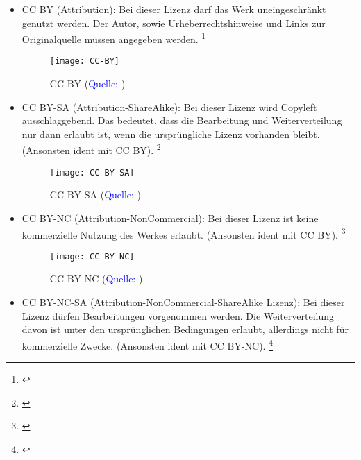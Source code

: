 \documentclass[titlepage,12pt,twoside]{article}
\begin{document}
\begin{itemize}
	\item CC BY (Attribution): Bei dieser  Lizenz darf das Werk uneingeschränkt genutzt werden. Der Autor, sowie 
	Urheberrechtshinweise und Links zur Originalquelle müssen angegeben werden. \footnote{\cite{bpb}}
	\begin{figure}[H]
		\begin{center}
			\scalebox{0.4}
			{\texttt{[image: CC-BY]}}
			\caption{CC BY (\textcolor{blue}{Quelle: \cite{CreativeCommonsBilder}})}
			\label{fig:CC BY}
		\end{center}
	\end{figure}
	\hfill \break
	\item CC BY-SA (Attribution-ShareAlike): Bei dieser  Lizenz wird Copyleft 
	ausschlaggebend. Das bedeutet, dass die Bearbeitung und Weiterverteilung nur dann erlaubt ist, wenn die ursprüngliche Lizenz vorhanden 
	bleibt. (Ansonsten ident mit CC BY). \footnote{\cite{bpb}}
	\begin{figure}[H]
		\begin{center}
			\scalebox{0.4}
			{\texttt{[image: CC-BY-SA]}}
			\caption{CC BY-SA (\textcolor{blue}{Quelle: \cite{CreativeCommonsBilder}})}
			\label{fig:CC BY-SA}
		\end{center}
	\end{figure}
	\hfill \break
	\item CC BY-NC (Attribution-NonCommercial): Bei dieser  Lizenz ist keine kommerzielle Nutzung 
	des Werkes erlaubt. (Ansonsten ident mit CC BY). \footnote{\cite{bpb}}
	\begin{figure}[H]
		\begin{center}
			\scalebox{0.4}
			{\texttt{[image: CC-BY-NC]}}
			\caption{CC BY-NC (\textcolor{blue}{Quelle: \cite{CreativeCommonsBilder}})}
			\label{fig:CC BY-NC}
		\end{center}
	\end{figure}
	\hfill \break
	\item CC BY-NC-SA (Attribution-NonCommercial-ShareAlike Lizenz): Bei dieser  Lizenz dürfen Bearbeitungen vorgenommen werden. Die Weiterverteilung davon ist unter den ursprünglichen Bedingungen erlaubt, 
	allerdings nicht für kommerzielle Zwecke. (Ansonsten ident mit CC BY-NC). \footnote{\cite{bpb}}

\end{itemize}
\end{document}
